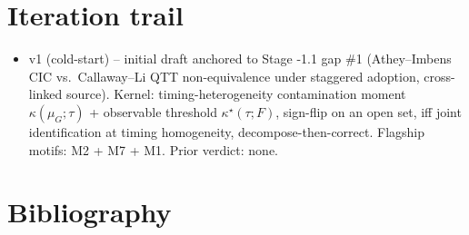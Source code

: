 \documentclass[11pt]{article}
\theoremstyle{definition}
\theoremstyle{plain}
\theoremstyle{remark}
\begin{document}
\section{Iteration trail}
\begin{itemize}[leftmargin=*,itemsep=2pt,topsep=2pt]
  \item v1 (cold-start) -- initial draft anchored to Stage -1.1 gap \#1 (Athey--Imbens CIC vs.\ Callaway--Li QTT non-equivalence under staggered adoption, cross-linked source). Kernel: timing-heterogeneity contamination moment $\kappa(\mu_G;\tau)$ + observable threshold $\kappa^\star(\tau;F)$, sign-flip on an open set, iff joint identification at timing homogeneity, decompose-then-correct. Flagship motifs: M2 + M7 + M1. Prior verdict: none.
\end{itemize}

\section*{Bibliography}
\end{document}
